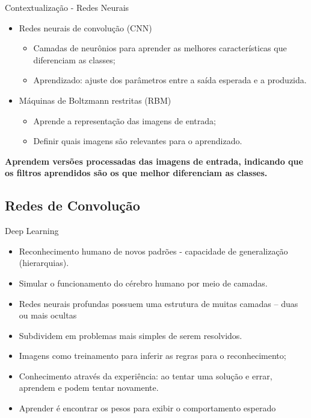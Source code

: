 \documentclass{beamer}
\begin{document}
\begin{frame}{Contextualização - Redes Neurais}
\setlength\leftmargini{0em}
\justifying
  \begin{itemize}
    \item Redes neurais de convolução (CNN)
    \begin{itemize}
        \item<2> Camadas de neurônios para aprender as melhores características que diferenciam as classes;
        \item<2> Aprendizado: ajuste dos parâmetros entre a saída esperada e a produzida.
    \end{itemize}
    \item <1,3> Máquinas de Boltzmann restritas (RBM)
    \begin{itemize}
        \item<3> Aprende a representação das imagens de entrada;
        \item<3> Definir quais imagens são relevantes para o aprendizado.
    \end{itemize}
  \end{itemize}
\textbf{Aprendem versões processadas das imagens de entrada, indicando que os filtros aprendidos são os que melhor diferenciam as classes.}
\end{frame}
\subsection{Redes de Convolução}
\begin{frame}{Deep Learning}
\setlength\leftmargini{0em}
\justifying
\begin{itemize}
  \item Reconhecimento humano de novos padrões - capacidade de generalização (hierarquias).%
  \item Simular o funcionamento do cérebro humano por meio de camadas.
  \item Redes neurais profundas possuem uma estrutura de muitas camadas -- duas ou mais ocultas %
  \item Subdividem em problemas mais simples de serem resolvidos.
  \item Imagens como treinamento para inferir as regras para o reconhecimento;
  \item Conhecimento através da experiência: ao tentar uma solução e errar, aprendem e podem tentar novamente. 
  \item Aprender é encontrar os pesos para exibir o comportamento esperado%
\end{itemize}


\end{frame}
\end{document}
